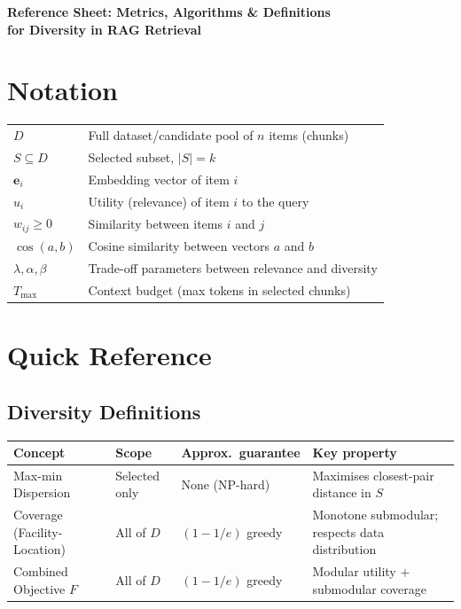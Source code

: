 \documentclass[11pt,a4paper]{article}
\begin{document}
\begin{center}
	{\large\bfseries Reference Sheet: Metrics, Algorithms \& Definitions\\for Diversity in RAG Retrieval}
\end{center}
\vspace{-1em}
\tableofcontents

\section{Notation}

\begin{tabular}{@{}ll@{}}
	$D$ & Full dataset/candidate pool of $n$ items (chunks)\\
	$S \subseteq D$ & Selected subset, $|S| = k$\\
	$\mathbf{e}_i$ & Embedding vector of item $i$\\
	$u_i$ & Utility (relevance) of item $i$ to the query\\
	$w_{ij} \geq 0$ & Similarity between items $i$ and $j$\\
	$\cos(a,b)$ & Cosine similarity between vectors $a$ and $b$\\
	$\lambda, \alpha, \beta$ & Trade-off parameters between relevance and diversity\\
	$T_{\max}$ & Context budget (max tokens in selected chunks)\\
\end{tabular}

\section{Quick Reference}

\subsection*{Diversity Definitions}

\begin{tabularx}{\textwidth}{@{}l l l X@{}}
	\toprule
	\textbf{Concept} & \textbf{Scope} & \textbf{Approx.\ guarantee} & \textbf{Key property} \\
	\midrule
	Max-min Dispersion & Selected only  & None (NP-hard) & Maximises closest-pair distance in $S$ \\
	Coverage (Facility-Location) & All of $D$ & $(1-1/e)$ greedy & Monotone submodular; respects data distribution \\
	Combined Objective $F$ & All of $D$ & $(1-1/e)$ greedy & Modular utility $+$ submodular coverage \\
	\bottomrule
\end{tabularx}
\end{document}
